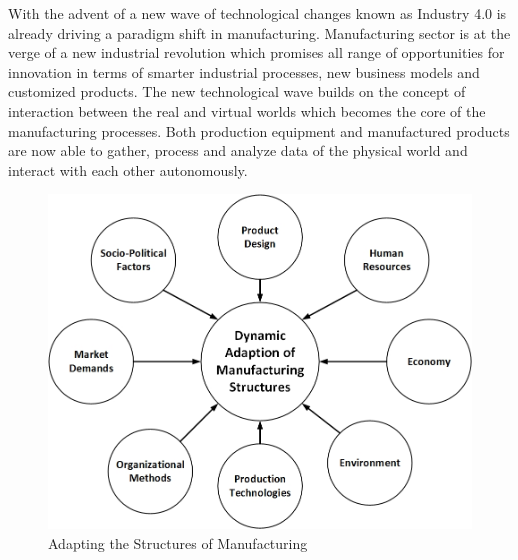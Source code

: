 With the advent of a new wave of technological changes known as Industry 4.0  is already driving a paradigm shift in manufacturing. Manufacturing sector is at the verge of a new industrial revolution which promises all range of opportunities for innovation in terms of smarter industrial processes, new business models and customized products. The new technological wave builds on the concept of interaction between the real and virtual worlds which becomes the core of the manufacturing processes. Both production equipment and manufactured products are now able to gather, process and analyze data of the physical world and interact with each other autonomously.
\begin{figure}[h!]
	\includegraphics[scale=0.35]{./gfx/addmanustr}
	\centering
	\caption{Adapting the Structures of Manufacturing \cite{WESTKAMP}}
	\label{fig:1.1}
\end{figure}


